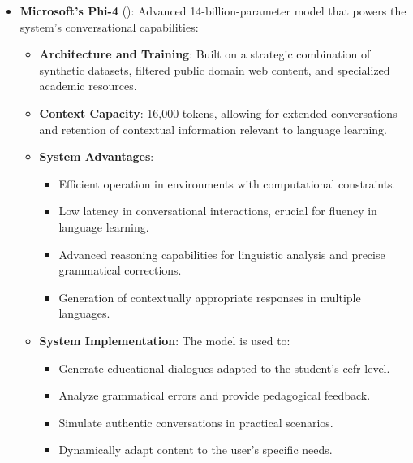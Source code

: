 \begin{itemize}
	\item \textbf{Microsoft's Phi-4} (\cite{abdin2024phi4technicalreport}): Advanced 14-billion-parameter model that powers the system's conversational capabilities:
		  \begin{itemize}
			  \item \textbf{Architecture and Training}: Built on a strategic combination of synthetic datasets, filtered public domain web content, and specialized academic resources.
			  \item \textbf{Context Capacity}: 16,000 tokens, allowing for extended conversations and retention of contextual information relevant to language learning.
			  \item \textbf{System Advantages}:
					\begin{itemize}
						\item Efficient operation in environments with computational constraints.
						\item Low latency in conversational interactions, crucial for fluency in language learning.
						\item Advanced reasoning capabilities for linguistic analysis and precise grammatical corrections.
						\item Generation of contextually appropriate responses in multiple languages.
					\end{itemize}
			  \item \textbf{System Implementation}: The model is used to:
					\begin{itemize}
						\item Generate educational dialogues adapted to the student's \gls{cefr} level.
						\item Analyze grammatical errors and provide pedagogical feedback.
						\item Simulate authentic conversations in practical scenarios.
						\item Dynamically adapt content to the user's specific needs.
					\end{itemize}
		  \end{itemize}


\end{itemize}
